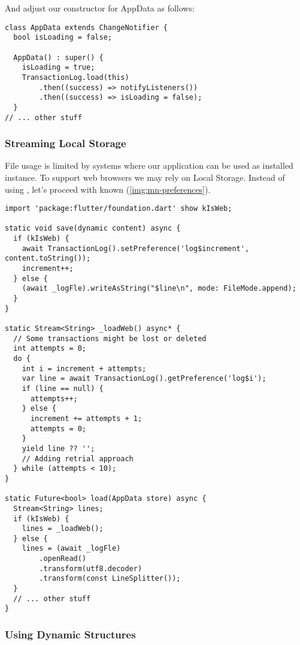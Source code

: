 And adjust our constructor for AppData as follows:

\begin{lstlisting}
class AppData extends ChangeNotifier {
  bool isLoading = false;

  AppData() : super() {
    isLoading = true;
    TransactionLog.load(this)
        .then((success) => notifyListeners())
        .then((success) => isLoading = false);
  }
// ... other stuff
\end{lstlisting}


\subsubsection{Streaming Local Storage}

File usage is limited by systems where our application can be used as installed instance. To support web browsers
we may rely on Local Storage. Instead of using , let's proceed with known  (\cref{img:mn-preferences}).

\begin{lstlisting}
import 'package:flutter/foundation.dart' show kIsWeb;

static void save(dynamic content) async {
  if (kIsWeb) {
    await TransactionLog().setPreference('log$increment', content.toString());
    increment++;
  } else {
    (await _logFle).writeAsString("$line\n", mode: FileMode.append);
  }
}

static Stream<String> _loadWeb() async* {
  // Some transactions might be lost or deleted
  int attempts = 0;
  do {
    int i = increment + attempts;
    var line = await TransactionLog().getPreference('log$i');
    if (line == null) {
      attempts++;
    } else {
      increment += attempts + 1;
      attempts = 0;
    }
    yield line ?? '';
    // Adding retrial approach
  } while (attempts < 10);
}

static Future<bool> load(AppData store) async {
  Stream<String> lines;
  if (kIsWeb) {
    lines = _loadWeb();
  } else {
    lines = (await _logFle)
        .openRead()
        .transform(utf8.decoder)
        .transform(const LineSplitter());
  }
  // ... other stuff
}
\end{lstlisting}



\subsubsection{Using Dynamic Structures}


